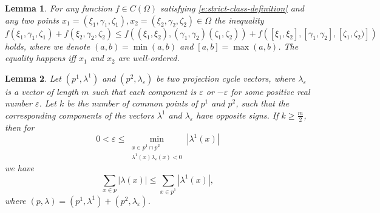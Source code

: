 \documentclass[10pt,a4paper]{amsart}
\newtheorem{lemma}{Lemma}
\begin{document}
\begin{lemma} \label{main-func-ineq}
For any function \(f \in C(\Omega)\) satisfying \eqref{e:strict-class-definition} and any two points \(x_1=(\xi_1, \gamma_1, \zeta_1),x_2=(\xi_2, \gamma_2, \zeta_2) \in \Omega\) the inequality
\begin{equation} \label{e:ordering}
    f(\xi_1, \gamma_1, \zeta_1)+f(\xi_2, \gamma_2, \zeta_2) \le f\left((\xi_1,\xi_2),( \gamma_1,\gamma_2)(\zeta_1,\zeta_2)\right) +f\left([\xi_1,\xi_2],[\gamma_1,\gamma_2],[\zeta_1,\zeta_2)]\right)
\end{equation}
holds, where we denote \((a,b)=\min(a,b)\) and \([a,b]=\max(a,b)\). The equality happens iff \(x_1\) and \(x_2\) are well-ordered.
\end{lemma}

\begin{lemma} \label{lemma-denominators}
    Let \((p^1,\lambda^1)\) and \((p^2,\lambda_\varepsilon)\) be two projection cycle vectors, where \(\lambda_\varepsilon\) is a vector of length \(m\) such that each component is \(\varepsilon\) or \(-\varepsilon\) for some positive real number \(\varepsilon\). Let \(k\) be the number of common points of \(p^1\) and \(p^2\), such that the corresponding components of the vectors \(\lambda^1\) and \(\lambda_\varepsilon\) have opposite signs. If \(k \ge \frac{m}{2} \), then for
    \[
    0 < \varepsilon \le \min_{\substack{x \in p^1 \cap p^2 \\ \lambda^1(x)\lambda_\varepsilon(x)<0}}|\lambda^1(x)|
    \] we have
    \begin{equation}
        \sum_{x \in p}|\lambda(x)| \le \sum_{x \in p^1}|\lambda^1(x)|,
    \end{equation}
    where \((p,\lambda)=(p^1,\lambda^1)+(p^2,\lambda_\varepsilon)\).
\end{lemma}
\end{document}
